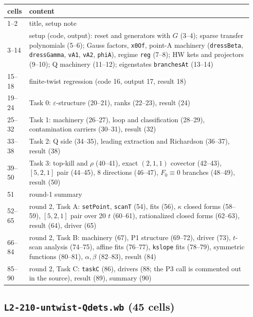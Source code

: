 \documentclass[10pt]{article}
\newcommand{\nb}[1]{\texttt{#1}}
\begin{document}
\begin{center}\small\setlength{\tabcolsep}{3pt}\begin{longtable}{@{}lp{11.5cm}@{}}\toprule
\textbf{cells} & \textbf{content} \\\midrule\endhead
1--2 & title, setup note \\
3--14 & setup (code, output): reset and generators with $G$ (3--4); sparse transfer polynomials (5--6); Gauss factors, \nb{x0Of}, point-A machinery (\nb{dressBeta}, \nb{dressGamma}, \nb{vA1}, \nb{vA2}, \nb{phiA}), regime \nb{reg} (7--8); HW kets and projectors (9--10); Q machinery (11--12); eigenstates \nb{branchesAt} (13--14) \\
15--18 & finite-twist regression (code 16, output 17, result 18) \\
19--24 & Task 0: $\varepsilon$-structure (20--21), ranks (22--23), result (24) \\
25--32 & Task 1: machinery (26--27), loop and classification (28--29), contamination carriers (30--31), result (32) \\
33--38 & Task 2: Q side (34--35), leading extraction and Richardson (36--37), result (38) \\
39--50 & Task 3: top-kill and $\rho$ (40--41), exact $(2,1,1)$ covector (42--43), $[5,2,1]$ pair (44--45), 8 directions (46--47), $F_0\equiv0$ branches (48--49), result (50) \\
51 & round-1 summary \\
52--65 & round 2, Task A: \nb{setPoint}, \nb{scanT} (54), fits (56), $\kappa$ closed forms (58--59), $[5,2,1]$ pair over 20 $t$ (60--61), rationalized closed forms (62--63), result (64), driver (65) \\
66--84 & round 2, Task B: machinery (67), P1 structure (69--72), driver (73), $t$-scan analysis (74--75), affine fits (76--77), \nb{kslope} fits (78--79), symmetric functions (80--81), $\alpha,\beta$ (82--83), result (84) \\
85--90 & round 2, Task C: \nb{taskC} (86), drivers (88; the P3 call is commented out in the source), result (89), summary (90) \\
\bottomrule\end{longtable}\end{center}

\subsection{\nb{L2-\allowbreak{}210-\allowbreak{}untwist-\allowbreak{}Qdets.\allowbreak{}wb} (45 cells)}\label{sec:cellsD}
\end{document}
